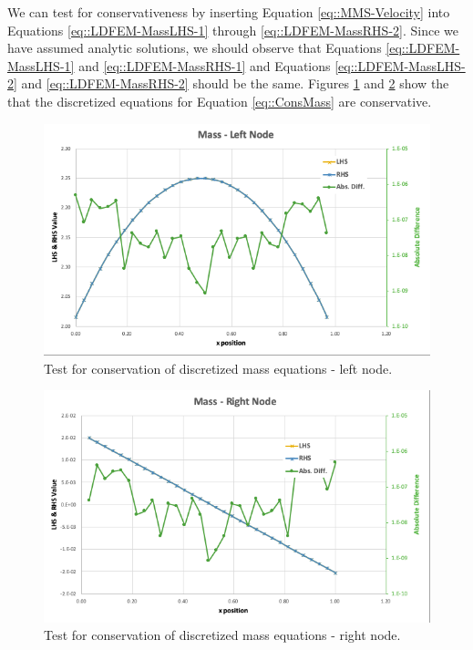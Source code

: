 \documentclass{article}
\begin{document}
We can test for conservativeness by inserting Equation \ref{eq::MMS-Velocity} into Equations \ref{eq::LDFEM-MassLHS-1} through \ref{eq::LDFEM-MassRHS-2}. Since we have assumed analytic solutions, we should observe that Equations \ref{eq::LDFEM-MassLHS-1} and \ref{eq::LDFEM-MassRHS-1} and Equations \ref{eq::LDFEM-MassLHS-2} and \ref{eq::LDFEM-MassRHS-2} should be the same. Figures \ref{fig::Mass-1} and \ref{fig::Mass-2} show the that the discretized equations for Equation \ref{eq::ConsMass} are conservative.
\begin{figure}[h!]
\centering
\includegraphics[scale=0.35]{./figures/Mass_1}
\caption{Test for conservation of discretized mass equations - left node.}
\label{fig::Mass-1}
\end{figure}
\begin{figure}[h!]
\centering
\includegraphics[scale=0.35]{./figures/Mass_2}
\caption{Test for conservation of discretized mass equations - right node.}
\label{fig::Mass-2}
\end{figure}
\end{document}
